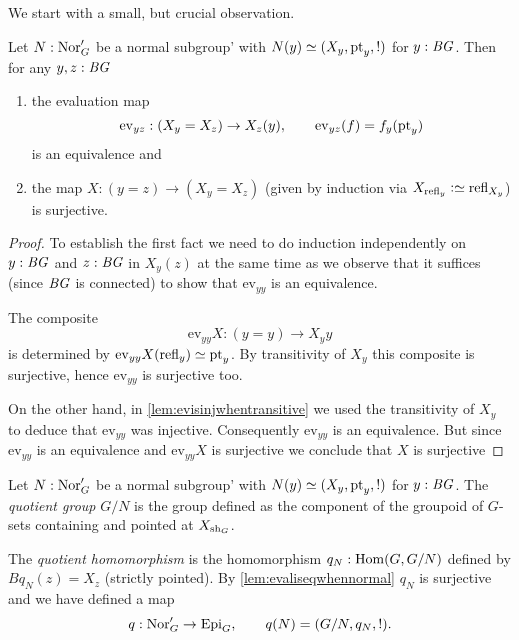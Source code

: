 We start with a small, but crucial observation.
\begin{lemma}
  \label{lem:evaliseqwhennormal}
  Let $N:\mathrm{Nor}'_G$ be a normal subgroup' with $N(y)\oldequiv (X_y,\pt_y,!)$ for $y:\mathit{B}\mathit{G}$.  Then for any $y,z:\mathit{B}\mathit{G}$
  \begin{enumerate}
  \item the evaluation map
$$\mathrm{ev}_{yz}:(X_y=X_z)\to X_z(y),\qquad \mathrm{ev}_{yz}(f)=f_y(\mathrm{pt}_y)$$
is an equivalence and
  \item  the map $X:(y=z)\to(X_y=X_z)$ (given by induction via $X_{\refl y}\defequi\refl{X_y}$) is surjective.
  \end{enumerate}
\end{lemma}
\begin{proof}
To establish the first fact we need to do induction independently on $y:\mathit{B}\mathit{G}$ and $z:\mathit{B}\mathit{G}$ in $X_y(z)$ at the same time as we observe that it suffices (since $\mathit{B}\mathit{G}$ is connected) to show that $\mathrm{ev}_{yy}$ is an equivalence.

The composite 
$$\mathrm{ev}_{yy}X:(y=y)\to X_yy$$ is determined by $\mathrm{ev}_{yy}X(\refl y)\oldequiv \pt_y$. 
By transitivity of $X_y$ this composite is surjective, hence $\mathrm{ev}_{yy}$ is surjective too.  

On the other hand, in  \cref{lem:evisinjwhentransitive} we used the transitivity of $X_y$ to deduce that $\mathrm{ev}_{yy}$ was injective.  Consequently $\mathrm{ev}_{yy}$ is an equivalence.  But since $\mathrm{ev}_{yy}$ is an equivalence and $\mathrm{ev}_{yy}X$ is surjective we conclude that $X$ is surjective
\end{proof}
\begin{definition}
\label{def:normalquotient}
  Let $N:\mathrm{Nor}'_G$ be a normal subgroup' with $N(y)\oldequiv (X_y,\pt_y,!)$ for $y:\mathit{B}\mathit{G}$.  The \emph{quotient group} $G/N$ is the group defined as the component of the groupoid of $G$-sets containing and pointed at $X_{\mathrm{sh}_G}$.  

The \emph{quotient homomorphism} is the homomorphism $q_N:\Hom(G,G/N)$  defined by $Bq_N(z)=X_z$ (strictly pointed).  By \cref{lem:evaliseqwhennormal} $q_N$ is surjective and we have defined a map
$$q:\mathrm{Nor}_G'\to\mathrm{Epi}_G,\qquad q(N)=(G/N,q_N,!).$$
\end{definition}

